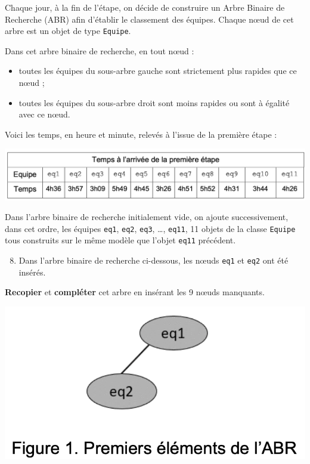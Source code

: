 Chaque jour, à la fin de l'étape, on décide de construire un Arbre
Binaire de Recherche (ABR) afin d'établir le classement des équipes.
Chaque nœud de cet arbre est un objet de type
\passthrough{\lstinline!Equipe!}.

Dans cet arbre binaire de recherche, en tout nœud :

\begin{itemize}
\item
  toutes les équipes du sous-arbre gauche sont strictement plus rapides
  que ce nœud ;
\item
  toutes les équipes du sous-arbre droit sont moins rapides ou sont à
  égalité avec ce nœud.
\end{itemize}

Voici les temps, en heure et minute, relevés à l'issue de la première
étape :

\includegraphics{24-NSIJ1ME1-Ex3-02.png}

Dans l'arbre binaire de recherche initialement vide, on ajoute
successivement, dans cet ordre, les équipes
\passthrough{\lstinline!eq1!}, \passthrough{\lstinline!eq2!},
\passthrough{\lstinline!eq3!}, \ldots, \passthrough{\lstinline!eq11!},
11 objets de la classe \passthrough{\lstinline!Equipe!} tous construits
sur le même modèle que l'objet \passthrough{\lstinline!eq11!} précédent.

\begin{enumerate}
\setcounter{enumi}{7}
\item
  Dans l'arbre binaire de recherche ci-dessous, les nœuds
  \passthrough{\lstinline!eq1!} et \passthrough{\lstinline!eq2!} ont été
  insérés.
\end{enumerate}

\textbf{Recopier} et \textbf{compléter} cet arbre en insérant les 9
nœuds manquants.

\includegraphics{24-NSIJ1ME1-Ex3-03.png}

